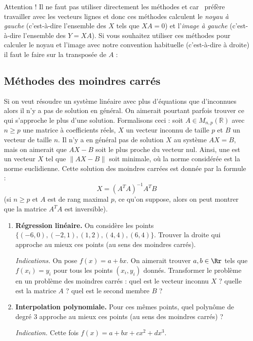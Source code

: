 \documentclass[class=report,crop=false]{standalone}
\begin{document}
Attention ! Il ne faut pas utiliser directement les méthodes 
et  car \Sage\ préfère travailler avec les vecteurs lignes et donc ces méthodes calculent le \emph{noyau à gauche} (c'est-à-dire l'ensemble des $X$ tels que $XA=0$)
et l'\emph{image à gauche} (c'est-à-dire l'ensemble des $Y=XA$). Si vous souhaitez utiliser ces méthodes pour calculer le noyau et l'image avec notre convention habituelle (c'est-à-dire à droite) il faut le faire sur la transposée de $A$ :

\subsection{Méthodes des moindres carrés}

Si on veut résoudre un système linéaire avec plus d'équations que d'inconnues 
alors il n'y a pas de solution en général. On aimerait pourtant parfois trouver 
ce qui s'approche le plus d'une solution.
Formalisons ceci : 
soit $A \in M_{n,p}(\mathbb R)$ avec $n \ge p$ une matrice à coefficients réels, 
$X$ un vecteur inconnu de taille $p$ et
$B$ un vecteur de taille $n$.
Il n'y a en général pas de solution $X$
au système $AX=B$, mais on aimerait que 
$AX-B$ soit le plus proche du vecteur nul.
Ainsi, une  est un vecteur $X$ 
tel que $\| AX -B \|$ soit minimale, où la norme considérée est la norme euclidienne.
Cette solution des moindres carrées est donnée par la formule :
\begin{equation}
\label{eq:moindrescarres}
\tag{\dag}
X = (A^TA)^{-1} A^T B
\end{equation}
(si $n \ge p$ et $A$ est de rang maximal $p$, ce qu'on suppose, alors on peut montrer que la matrice $A^TA$ est inversible).


\begin{tp}
\sauteligne
\begin{enumerate}
  \item \textbf{Régression linéaire.} 
  On considère les points $\big\{(-6,0), (-2,1), (1,2), (4,4), (6,4)\big\}$.
  Trouver la droite qui approche au mieux ces points (au sens des moindres carrés).
  
  \emph{Indications.} On pose $f(x) = a +bx$. On aimerait trouver $a,b \in \Rr$ tels que 
  $f(x_i)=y_i$ pour tous les points $(x_i,y_i)$ donnés. 
  Transformer le problème en un problème des moindres carrés : quel est le vecteur inconnu $X$ ?
  quelle est la matrice $A$ ? quel est le second membre $B$ ?
    
  \item \textbf{Interpolation polynomiale.} 
  Pour ces mêmes points, quel polynôme de degré $3$ approche 
  au mieux ces points (au sens des moindres carrés) ?
  
  \emph{Indication.} Cette fois $f(x) = a + bx + cx^2 + dx^3$.
  
  
\end{enumerate}
 
\end{tp}
\end{document}
